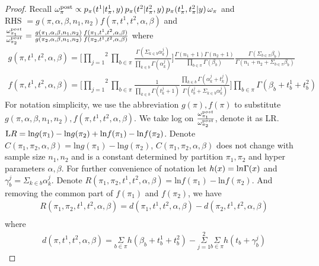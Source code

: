 \documentclass[aoas,preprint]{imsart}
\begin{document}
\begin{proof}
Recall $ \omega^{\rm post}_\pi \propto 
 p_\pi(t^1 | t^1_{\pi},y)\, p_\pi(t^2|  t^2_{\pi},y )
 \, p_\pi( t^1_{\pi}, t^2_{\pi} | y ) \, \omega_\pi$ and \\
 RHS $=  g(\pi, \alpha, \beta, n_1, n_2) f(\pi, t^1, t^2, \alpha, \beta)$ and $\frac{\omega_{\pi_1}^{\text post}}{\omega_{\pi_2}^{\text post}} = \frac{g(\pi_1, \alpha, \beta, n_1, n_2)}{g(\pi_2, \alpha, \beta, n_1, n_2)}\frac{f(\pi_1, t^1, t^2, \alpha, \beta)}{f(\pi_2, t^1, t^2, \alpha, \beta)}$
 where \begin{eqnarray*}
 g(\pi, t^1, t^2, \alpha, \beta) = \big[ \overset{2}{\underset{j = 1}{\prod}}\underset{b\in \pi}\prod \frac{\Gamma(\Sigma_{k\in b} \alpha_k^j)}{\prod_{k\in b} \Gamma(\alpha_k^j)} \big ] \frac{\Gamma(n_1 + 1) \Gamma(n_2 + 1)}{\prod_{b\in \pi} \Gamma(\beta_b)} \frac{\Gamma(\Sigma_{b \in \pi} \beta_b)}{\Gamma(n_1 + n_2 + \Sigma_{b\in\pi} \beta_b)}\\
f(\pi, t^1, t^2, \alpha, \beta) = \big[ \overset{2}{\underset{j = 1}{\prod}}\underset{b\in \pi}\prod \frac{1}{\prod_{k \in b}\Gamma(t_k^j + 1)}\frac{\prod_{k \in b}\Gamma(\alpha_k^j + t_k^j)}{\Gamma(t_b^j + \Sigma_{k\in b}\alpha_k^j)}\big ] \underset{b\in \pi}\prod \Gamma(\beta_b + t_b^1 + t_b^2) 
\end{eqnarray*}
For notation simplicity, we use the abbreviation $g(\pi), f(\pi)$ to substitute \\
$g(\pi, \alpha, \beta, n_1, n_2),f(\pi, t^1, t^2, \alpha, \beta)$.  We take log on $\frac{\omega_{\pi_1}^{\text post}}{\omega_{\pi_2}^{\text post}}$, denote it as LR. $\text LR = \text{ln}g(\pi_1) - \text{ln}g(\pi_2) + \text{ln}f(\pi_1) - \text{ln}f(\pi_2)$. Denote $C(\pi_1, \pi_2, \alpha, \beta) = \text{ln}g(\pi_1) - \text{ln}g(\pi_2)$, $C(\pi_1, \pi_2, \alpha, \beta)$ does not change with sample size $n_1, n_2$ and is a constant determined by partition $\pi_1, \pi_2$ and hyper parameters $\alpha, \beta$.  For further convenience of notation let $h(x) = \text ln\Gamma(x)$ and $\gamma_b^j = \Sigma_{k\in b} \alpha_k^j$. Denote $R(\pi_1, \pi_2, t^1, t^2, \alpha, \beta) = \text{ln}f(\pi_1) - \text{ln}f(\pi_2)$. And removing the common part of $f(\pi_1)$ and $f(\pi_2)$, we have 
\begin{eqnarray*}
R(\pi_1, \pi_2, t^1, t^2, \alpha, \beta) = d(\pi_1, t^1, t^2, \alpha, \beta) - d(\pi_2, t^1, t^2, \alpha, \beta)\\
\end{eqnarray*}
where
\begin{eqnarray*}
d(\pi, t^1, t^2, \alpha, \beta) = \underset{b\in \pi}\Sigma h(\beta_b + t_b^1 + t_b^2) - \overset{2}{\underset{j = 1}{\Sigma}} \underset{b\in \pi}\Sigma h(t_b + \gamma_b^j)
\end{eqnarray*}



\end{proof}
\end{document}
